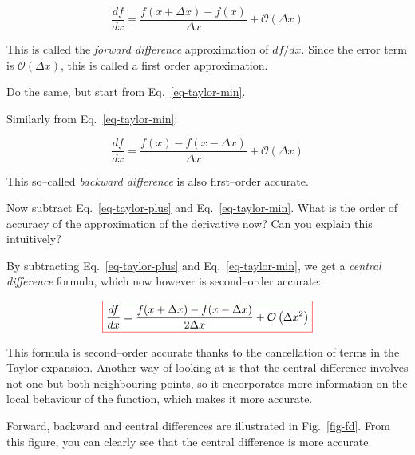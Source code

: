 \begin{equation}
\frac{d f}{d x} = \frac{f(x+\Delta x) - f(x)}{\Delta x} + \mathcal{O}\left(\Delta x\right)
\end{equation} 

This is called the \emph{forward difference} approximation of $df / dx$. Since the error term is $\mathcal{O}(\Delta x)$, this is called a first order approximation.

\begin{cue}
Do the same, but start from Eq.~\ref{eq-taylor-min}.
\end{cue}

Similarly from Eq.~\ref{eq-taylor-min}:

\begin{equation}
\frac{d f}{d x} = \frac{f(x) - f(x- \Delta x)}{\Delta x} + \mathcal{O}\left(\Delta x\right)
\end{equation} 

This so--called \emph{backward difference} is also first--order accurate.

\begin{cue}
Now subtract Eq.~\ref{eq-taylor-plus} and Eq.~\ref{eq-taylor-min}. What is the order of accuracy of the approximation of the derivative now? Can you explain this intuitively?
\end{cue}

By subtracting Eq.~\ref{eq-taylor-plus} and Eq.~\ref{eq-taylor-min}, we get a \emph{central difference} formula, which now however is second--order accurate:

\begin{equation}
\fbox{$\displaystyle
\frac{d f}{d x} = \frac{f(x + \Delta x) - f(x- \Delta x)}{2 \Delta x} + \mathcal{O}\left(\Delta x^2\right)
$}
\end{equation} 

This formula is second--order accurate thanks to the cancellation of terms in the Taylor expansion. Another way of looking at is that the central difference involves not one but both neighbouring points, so it encorporates more information on the local behaviour of the function, which makes it more accurate.

Forward, backward and central differences are illustrated in Fig.~\ref{fig-fd}. From this figure, you can clearly see that the central difference is more accurate.

